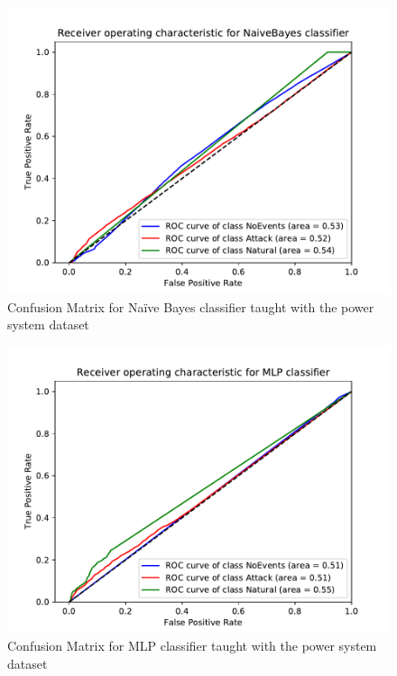 \begin{figure}[t]
    \centering
    \includegraphics[page=2, width=180mm, trim= 0 50 0 100, clip]{images/results_scikit/NaiveBayes}
    \caption{Confusion Matrix for Naïve Bayes classifier taught with the power system dataset}
    \label{fig:scikit_NB_CM}
\end{figure}

\begin{figure}[t]
    \centering
    \includegraphics[page=2, width=180mm, trim= 0 50 0 100, clip]{images/results_scikit/MLP}
    \caption{Confusion Matrix for MLP classifier taught with the power system dataset}
    \label{fig:scikit_MLP_CM}
\end{figure}

